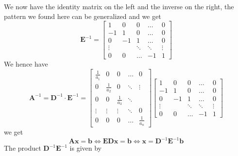 \documentclass{article}
\begin{document}
We now have the identity matrix on the left and the inverse on the right, the pattern we found here can be generalized and we get 
\begin{equation*}
    \mathbf{E}^{-1} = \begin{bmatrix}
        1 & 0 & 0 & \dots & 0 \\
        -1 & 1 & 0 & \dots & 0 \\
        0 & -1 & 1 & \dots & 0 \\
        \vdots & & \ddots & \ddots & \vdots\\
        0 & 0 & \dots & -1 & 1
    \end{bmatrix}
\end{equation*}
We hence have
\begin{equation*}
    \mathbf{A}^{-1} = \mathbf{D}^{-1} \cdot \mathbf{E}^{-1} = \begin{bmatrix}
        \frac{1}{a_{1}}& 0 & 0 & \dots & 0 \\
    0 & \frac{1}{a_{2}}& 0 & \ddots & \vdots \\
    0& 0 & \frac{1}{a_{3}} & \ddots & \\
    \vdots & \vdots & \vdots& \ddots & 0 \\
    0 & 0 & 0 & \dots & \frac{1}{a_{n}}
    \end{bmatrix}\begin{bmatrix}
        1 & 0 & 0 & \dots & 0 \\
        -1 & 1 & 0 & \dots & 0 \\
        0 & -1 & 1 & \dots & 0 \\
        \vdots & & \ddots & \ddots & \vdots\\
        0 & 0 & \dots & -1 & 1
    \end{bmatrix}
\end{equation*}
we get 
\begin{equation*}
    \mathbf{A}\mathbf{x} = \mathbf{b} \Longleftrightarrow \mathbf{E}\mathbf{D}\mathbf{x} = \mathbf{b} \Longleftrightarrow \mathbf{x} = \mathbf{D}^{-1}\mathbf{E}^{-1}\mathbf{b}
\end{equation*}
The product $\mathbf{D}^{-1}\mathbf{E}^{-1}$ is given by
\end{document}
